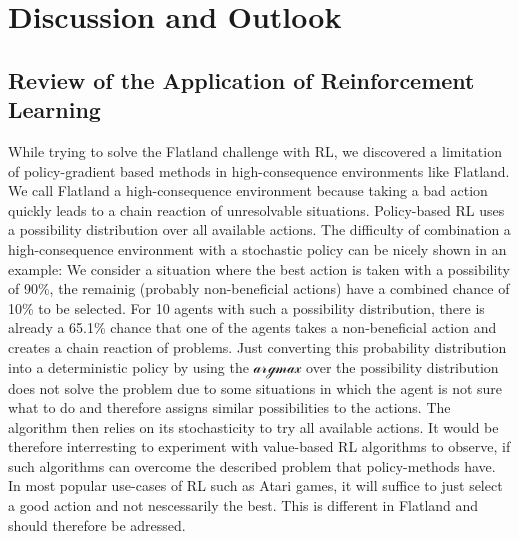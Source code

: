 %
%

\chapter{Discussion and Outlook}
\label{chap.diskussion}
\section{Review of the Application of Reinforcement Learning}\label{discussion_rl}
While trying to solve the Flatland challenge with RL, we discovered a limitation of policy-gradient based methods in high-consequence environments like Flatland. 
We call Flatland a high-consequence environment because taking a bad action quickly leads to a chain reaction of unresolvable situations. Policy-based RL uses a possibility distribution over all available actions. The difficulty of combination a high-consequence environment with a stochastic policy can be nicely shown in an example: We consider a situation where the best action is taken with a possibility of 90\%, the remainig (probably non-beneficial actions) have a combined chance of 10\% to be selected. For 10 agents with such a possibility distribution, there is already a 65.1\% chance that one of the agents takes a non-beneficial action and creates a chain reaction of problems. Just converting this probability distribution into a deterministic policy by using the $\mathcal{argmax}$ over the possibility distribution does not solve the problem due to some situations in which the agent is not sure what to do and therefore assigns similar possibilities to the actions. The algorithm then relies on its stochasticity to try all available actions. It would be therefore interresting to experiment with value-based RL algorithms to observe, if such algorithms can overcome the described problem that policy-methods have. In most popular use-cases of RL such as Atari games, it will suffice to just select a good action and not nescessarily the best. This is different in Flatland and should therefore be adressed.

